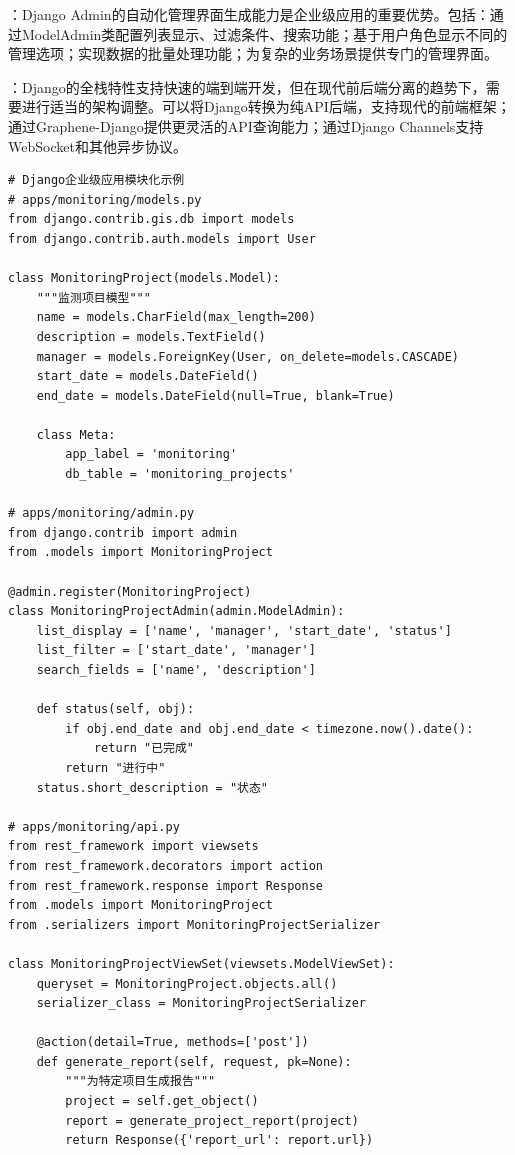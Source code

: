 ：Django Admin的自动化管理界面生成能力是企业级应用的重要优势。包括：通过ModelAdmin类配置列表显示、过滤条件、搜索功能；基于用户角色显示不同的管理选项；实现数据的批量处理功能；为复杂的业务场景提供专门的管理界面。

：Django的全栈特性支持快速的端到端开发，但在现代前后端分离的趋势下，需要进行适当的架构调整。可以将Django转换为纯API后端，支持现代的前端框架；通过Graphene-Django提供更灵活的API查询能力；通过Django Channels支持WebSocket和其他异步协议。

\begin{lstlisting}[style=python]
# Django企业级应用模块化示例
# apps/monitoring/models.py
from django.contrib.gis.db import models
from django.contrib.auth.models import User

class MonitoringProject(models.Model):
    """监测项目模型"""
    name = models.CharField(max_length=200)
    description = models.TextField()
    manager = models.ForeignKey(User, on_delete=models.CASCADE)
    start_date = models.DateField()
    end_date = models.DateField(null=True, blank=True)
    
    class Meta:
        app_label = 'monitoring'
        db_table = 'monitoring_projects'
        
# apps/monitoring/admin.py
from django.contrib import admin
from .models import MonitoringProject

@admin.register(MonitoringProject)
class MonitoringProjectAdmin(admin.ModelAdmin):
    list_display = ['name', 'manager', 'start_date', 'status']
    list_filter = ['start_date', 'manager']
    search_fields = ['name', 'description']
    
    def status(self, obj):
        if obj.end_date and obj.end_date < timezone.now().date():
            return "已完成"
        return "进行中"
    status.short_description = "状态"

# apps/monitoring/api.py
from rest_framework import viewsets
from rest_framework.decorators import action
from rest_framework.response import Response
from .models import MonitoringProject
from .serializers import MonitoringProjectSerializer

class MonitoringProjectViewSet(viewsets.ModelViewSet):
    queryset = MonitoringProject.objects.all()
    serializer_class = MonitoringProjectSerializer
    
    @action(detail=True, methods=['post'])
    def generate_report(self, request, pk=None):
        """为特定项目生成报告"""
        project = self.get_object()
        report = generate_project_report(project)
        return Response({'report_url': report.url})
\end{lstlisting}

